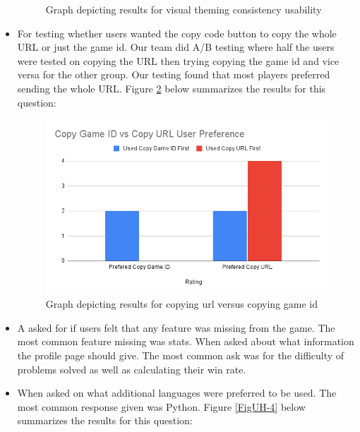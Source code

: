 \documentclass[12pt, titlepage]{article}
\begin{document}
\begin{itemize}
\begin{figure}[H]
    \caption{Graph depicting results for visual theming consistency usability}
    
    \label{FigUH-2}
    \end{figure}

    \item For testing whether users wanted the copy code button to copy the whole URL or just the game id. Our team did A/B testing where half the users were tested on copying the URL then trying copying the game id and vice versa for the other group. Our testing found that most players preferred sending the whole URL. Figure \ref{FigUH-3} below summarizes the results for this question:
    \begin{figure}[H]
    \centering
    \includegraphics[width=1\textwidth]{question3chart.png}
    
    \caption{Graph depicting results for copying url versus copying game id}
    
    \label{FigUH-3}
    \end{figure}

    \item A asked for if users felt that any feature was missing from the game. The most common feature missing was stats. When asked about what information the profile page should give. The most common ask was for the difficulty of problems solved as well as calculating their win rate.

    \item When asked on what additional languages were preferred to be used. The most common response given was Python. Figure \ref{FigUH-4} below summarizes the results for this question:


\end{itemize}
\end{document}
